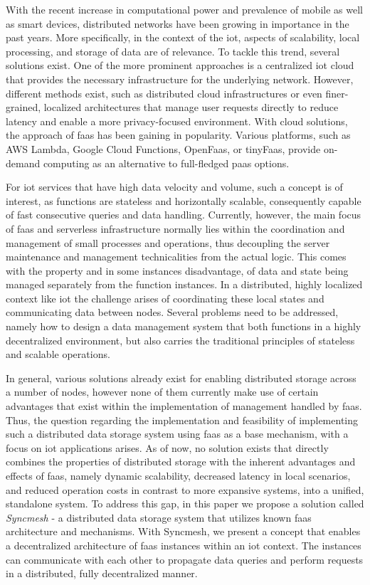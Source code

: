 \documentclass[conference]{IEEEtran}
\begin{document}
With the recent increase in computational power and prevalence of mobile as well as smart devices, distributed networks have been growing in importance in the past years. More specifically, in the context of the \ac{iot}, aspects of scalability, local processing, and storage of data are of relevance. To tackle this trend, several solutions exist. One of the more prominent approaches is a centralized \ac{iot} cloud that provides the necessary infrastructure for the underlying network. However, different methods exist, such as distributed cloud infrastructures or even finer-grained, localized architectures that manage user requests directly to reduce latency and enable a more privacy-focused environment. With cloud solutions, the approach of \ac{faas} has been gaining in popularity. Various platforms, such as AWS Lambda, Google Cloud Functions, OpenFaas, or tinyFaas, provide on-demand computing as an alternative to full-fledged \ac{paas} options.

For \ac{iot} services that have high data velocity and volume, such a concept is of interest, as functions are stateless and horizontally scalable, consequently capable of fast consecutive queries and data handling. Currently, however, the main focus of \ac{faas} and serverless infrastructure normally lies within the coordination and management of small processes and operations, thus decoupling the server maintenance and management technicalities from the actual logic. This comes with the property and in some instances disadvantage, of data and state being managed separately from the function instances. In a distributed, highly localized context like \ac{iot} the challenge arises of coordinating these local states and communicating data between nodes. Several problems need to be addressed, namely how to design a data management system that both functions in a highly decentralized environment, but also carries the traditional principles of stateless and scalable operations.

In general, various solutions already exist for enabling distributed storage across a number of nodes, however none of them currently make use of certain advantages that exist within the implementation of management handled by \ac{faas}. Thus, the question regarding the implementation and feasibility of implementing such a distributed data storage system using \ac{faas} as a base mechanism, with a focus on \ac{iot} applications arises. As of now, no solution exists that directly combines the properties of distributed storage with the inherent advantages and effects of \ac{faas}, namely dynamic scalability, decreased latency in local scenarios, and reduced operation costs in contrast to more expansive systems, into a unified, standalone system. To address this gap, in this paper we propose a solution called \emph{Syncmesh} - a distributed data storage system that utilizes known \ac{faas} architecture and mechanisms.
With Syncmesh, we present a concept that enables a decentralized architecture of \ac{faas} instances within an \ac{iot} context. The instances can communicate with each other to propagate data queries and perform requests in a distributed, fully decentralized manner.
\end{document}
